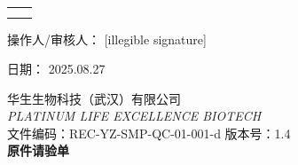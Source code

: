 \documentclass[UTF8,10pt,a4paper,fontset=fandol]{ctexart}
\newcommand{\fieldvalue}[1]{#1}
\newcommand{\handwritten}[1]{#1}
\begin{document}
\vspace{1em}

\begin{center}
\begin{tabular}{cc}
\fbox{\rule{0pt}{4.0cm}\rule{0.42\textwidth}{0pt}} &
\fbox{\rule{0pt}{4.0cm}\rule{0.42\textwidth}{0pt}} \\[1em]
\fbox{\rule{0pt}{4.0cm}\rule{0.42\textwidth}{0pt}} &
\fbox{\rule{0pt}{4.0cm}\rule{0.42\textwidth}{0pt}}
\end{tabular}
\end{center}

\vfill

操作人/审核人：
\fieldvalue{\handwritten{[illegible signature]}}

\hfill 日期：
\fieldvalue{\handwritten{2025.08.27}}

\newpage

\begin{center}
\small
华生生物科技（武汉）有限公司\\
\textit{PLATINUM LIFE EXCELLENCE BIOTECH}\\[2pt]
文件编码：REC-YZ-SMP-QC-01-001-d \hfill 版本号：1.4\\[2pt]
\textbf{\Large 原件请验单}
\end{center}
\end{document}
